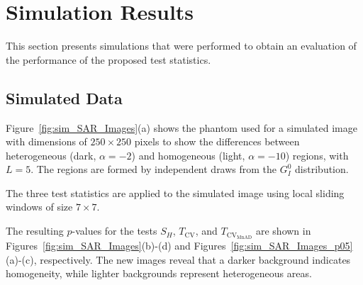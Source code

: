 \documentclass[remotesensing,article,submit,moreauthors,pdftex]{Definitions/mdpi}
\begin{document}
\hypertarget{sec:Results}{%
\section{Simulation Results}\label{sec:Results}}

This section presents simulations that were performed to obtain an evaluation of the performance of the proposed test statistics.

\hypertarget{simulated-data}{%
\subsection{Simulated Data}\label{simulated-data}}

Figure~\ref{fig:sim_SAR_Images}(a) shows the phantom used for a simulated image with dimensions of \(250\times 250\) pixels to show the differences between heterogeneous (dark, \(\alpha=-2\))
and homogeneous (light, \(\alpha=-10\)) regions, with \(L = 5\). 
The regions are formed by independent draws from the \(G^0_I\) distribution.

The three test statistics are applied to the simulated image using local
sliding windows of size \(7\times 7\).

The resulting \(p\)-values for the tests \(S_H\), \(T_{\text{CV}}\), and
\(T_{\text{CV}_{\text{MnAD}}}\) are shown in
Figures~\ref{fig:sim_SAR_Images}(b)-(d) and
Figures~\ref{fig:sim_SAR_Images_p05}(a)-(c), respectively. 
The new images reveal that a darker background indicates homogeneity, while lighter backgrounds represent heterogeneous areas.
\end{document}
